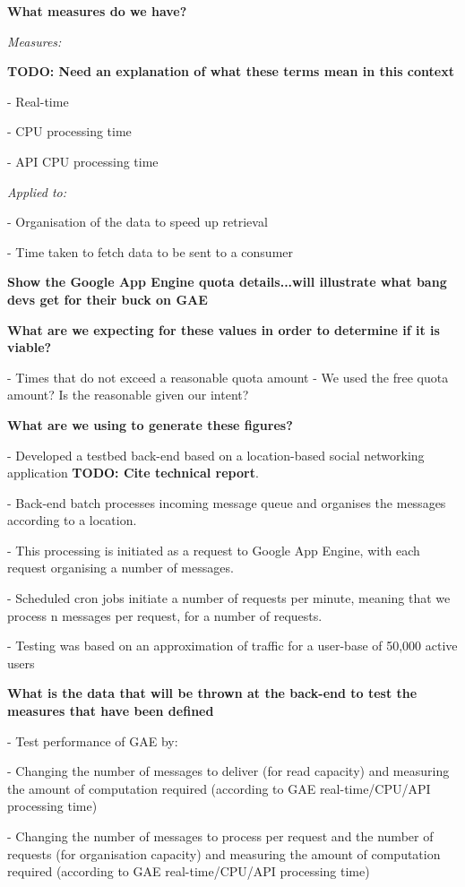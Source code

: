 \documentclass{article}
\begin{document}
\crumbs
{
\textbf{What measures do we have?}

\emph{Measures:}

\textbf{TODO: Need an explanation of what these terms mean in this context}

- Real-time

- CPU processing time

- API CPU processing time

\emph{Applied to:}

- Organisation of the data to speed up retrieval

- Time taken to fetch data to be sent to a consumer

}

\crumbs
{
\textbf{Show the Google App Engine quota details...will illustrate what bang devs get for their buck on GAE}
}

\crumbs
{
	\textbf{What are we expecting for these values in order to determine if it is viable?}
	
	- Times that do not exceed a reasonable quota amount
	- We used the free quota amount? Is the reasonable given our intent?
}

\crumbs
{
	\textbf{What are we using to generate these figures?}
	
	- Developed a testbed back-end based on a location-based social networking application \textbf{TODO: Cite technical report}.
	
	- Back-end batch processes incoming message queue and organises the messages according to a location.
	
	- This processing is initiated as a request to Google App Engine, with each request organising a number of messages.
	
	- Scheduled cron jobs initiate a number of requests per minute, meaning that we process n messages per request, for a number of requests.
	
	- Testing was based on an approximation of traffic for a user-base of 50,000 active users
}

\crumbs
{
	\textbf{What is the data that will be thrown at the back-end to test the measures that have been defined}
	
	- Test performance of GAE by:
	
	- Changing the number of messages to deliver (for read capacity) and measuring the amount of computation required (according to GAE real-time/CPU/API processing time)
	
	- Changing the number of messages to process per request and the number of requests (for organisation capacity) and measuring the amount of computation required (according to GAE real-time/CPU/API processing time)
}
\end{document}
